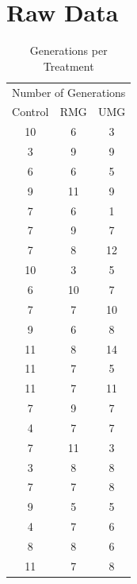 \documentclass{strrespaper-trad}
\begin{document}
	\chapter{Raw Data}
		\begin{table}[htbp]
			\centering
			\caption{Generations per Treatment}
			\label{tab:gen_treatment}
			\begin{tabular}{ccc}
				\toprule
				\multicolumn{3}{l}{Number of Generations} \\
				Control & RMG & UMG                       \\
				\midrule
				10      & 6   & 3                         \\
				3       & 9   & 9                         \\
				6       & 6   & 5                         \\
				9       & 11  & 9                         \\
				7       & 6   & 1                         \\
				7       & 9   & 7                         \\
				7       & 8   & 12                        \\
				10      & 3   & 5                         \\
				6       & 10  & 7                         \\
				7       & 7   & 10                        \\
				9       & 6   & 8                         \\
				11      & 8   & 14                        \\
				11      & 7   & 5                         \\
				11      & 7   & 11                        \\
				7       & 9   & 7                         \\
				4       & 7   & 7                         \\
				7       & 11  & 3                         \\
				3       & 8   & 8                         \\
				7       & 7   & 8                         \\
				9       & 5   & 5                         \\
				4       & 7   & 6                         \\
				8       & 8   & 6                         \\
				11      & 7   & 8                         \\

\end{tabular}
\end{table}
\end{document}
